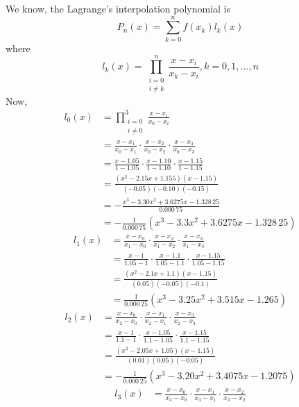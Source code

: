 \documentclass[12pt,class=book,crop=false]{standalone}
\begin{document}
\begin{soln}
    We know, the Lagrange's interpolation polynomial is
    \[
        P_n(x)=\sum_{k=0}^nf(x_k)l_k(x)
    \]
    where
    \[
        l_k(x)=\prod_{\substack{i=0\\ i\neq k}}^n\frac{x-x_i}{x_k-x_i}, k=0,1,\dots,n
    \]
    Now,\begin{align*}
        l_0(x) & = \prod_{\substack{i=0                                                      \\ i\neq 0}}^3\frac{x-x_i}{x_0-x_i}\\
               & = \frac{x-x_1}{x_0-x_1}\cdot\frac{x-x_2}{x_0-x_2}\cdot\frac{x-x_3}{x_0-x_3} \\
               & = \frac{x-1.05}{1-1.05}\cdot\frac{x-1.10}{1-1.10}\cdot\frac{x-1.15}{1-1.15} \\
               & = \frac{(x^2-2.15x+1.155)(x-1.15)}{(-0.05)(-0.10)(-0.15)}                   \\
               & = -\frac{x^3-3.30x^2+3.6275x-1.328\,25}{0.000\,75}                              \\
               & = -\frac{1}{0.000\,75}(x^3-3.3x^2+3.6275x-1.328\,25)
    \end{align*}
    \begin{align*}
        l_1(x) & = \frac{x-x_0}{x_1-x_0}\cdot\frac{x-x_2}{x_1-x_2}\cdot\frac{x-x_3}{x_1-x_3}  \\
               & = \frac{x-1}{1.05-1}\cdot\frac{x-1.1}{1.05-1.1}\cdot\frac{x-1.15}{1.05-1.15} \\
               & = \frac{(x^2-2.1x+1.1)(x-1.15)}{(0.05)(-0.05)(-0.1)}                         \\
               & = \frac{1}{0.000\,25}(x^3-3.25x^2+3.515x-1.265)
    \end{align*}
    \begin{align*}
        l_2(x) & = \frac{x-x_0}{x_2-x_0}\cdot\frac{x-x_1}{x_2-x_1}\cdot\frac{x-x_3}{x_2-x_3} \\
               & = \frac{x-1}{1.1-1}\cdot\frac{x-1.05}{1.1-1.05}\cdot\frac{x-1.15}{1.1-1.15} \\
               & = \frac{(x^2-2.05x+1.05)(x-1.15)}{(0.01)(0.05)(-0.05)}                      \\
               & = -\frac{1}{0.000\,25}(x^3-3.20x^2+3.4075x-1.2075)
    \end{align*}
    \begin{align*}
        l_3(x) & = \frac{x-x_0}{x_3-x_0}\cdot\frac{x-x_1}{x_3-x_1}\cdot\frac{x-x_2}{x_3-x_2}  \\

\end{align*}
\end{soln}
\end{document}
